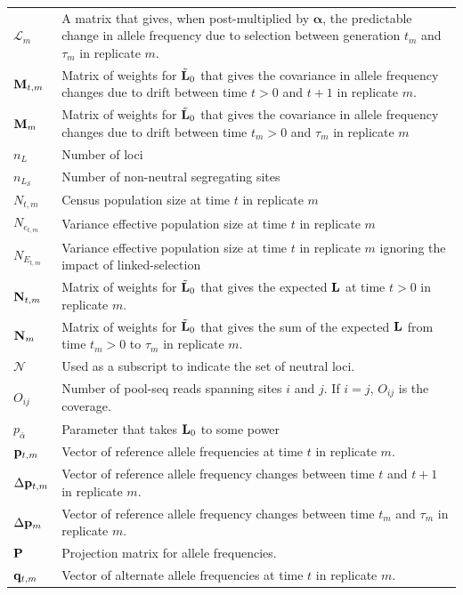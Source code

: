 \documentclass[12pt]{article}
\begin{document}
\begin{longtable}{|p{2cm}|p{13cm}|}
$\boldsymbol{\mathcal{L}}_m$&A matrix that gives, when post-multiplied by $\boldsymbol{\alpha}$, the predictable change in allele frequency due to selection between generation $t_m$ and $\tau_m$ in replicate $m$.\\
${\bf M}_{t,m}$&Matrix of weights for $\tilde{\bf L}_{0}$ that gives the covariance in allele frequency changes  due to drift between time $t>0$ and $t+1$ in replicate $m$.\\
${\bf M}_{m}$&Matrix of weights for $\tilde{\bf L}_{0}$ that gives the covariance in allele frequency changes  due to drift between time $t_m>0$ and $\tau_m$ in replicate $m$\\
$n_L$&Number of loci\\
$n_{L_\mathcal{S}}$&Number of non-neutral segregating sites\\
$N_{t,m}$&Census population size at time $t$ in replicate $m$\\
$N_{e_{t,m}}$&Variance effective population size at time $t$ in replicate $m$\\
$N_{E_{t,m}}$&Variance effective population size at time $t$ in replicate $m$ ignoring the impact of linked-selection\\
${\bf N}_{t,m}$&Matrix of weights for $\tilde{\bf L}_{0}$ that gives the expected ${\bf L}$ at time $t>0$ in replicate $m$.\\
${\bf N}_{m}$&Matrix of weights for $\tilde{\bf L}_{0}$ that gives the sum of the expected ${\bf L}$ from time $t_m>0$ to $\tau_m$ in replicate $m$.\\
$\mathcal{N}$&Used as a subscript to indicate the set of neutral loci.\\
$O_{ij}$& Number of pool-seq reads spanning sites $i$ and $j$. If $i=j$, $O_{ij}$ is the coverage.\\
$p_{\bar{\alpha}}$&Parameter that takes ${\bf L}_0$ to some power \\
${\bf p}_{t,m}$& Vector of reference allele frequencies at time $t$ in replicate $m$.\\
$\Delta {\bf p}_{t,m}$&Vector of reference allele frequency changes between time $t$ and $t+1$ in replicate $m$.\\
$\Delta {\bf p}_{m}$&Vector of reference allele frequency changes between time $t_m$ and $\tau_m$ in replicate $m$.\\
${\bf P}$&Projection matrix for allele frequencies.\\
${\bf q}_{t,m}$& Vector of alternate allele frequencies at time $t$ in replicate $m$.\\

\end{longtable}
\end{document}
